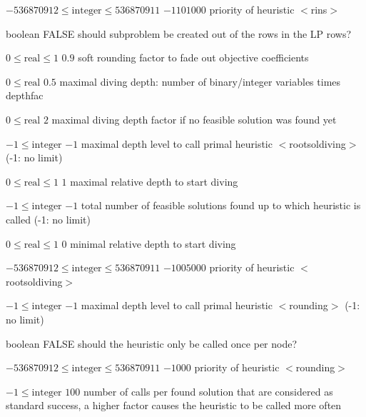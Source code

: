 %
{$-536870912\leq\textrm{integer}\leq536870911$}%
{$-1101000$}%
{priority of heuristic $<$rins$>$}%
{}

%
{boolean}%
{FALSE}%
{should subproblem be created out of the rows in the LP rows?}%
{}

%
{$0\leq\textrm{real}\leq1$}%
{$0.9$}%
{soft rounding factor to fade out objective coefficients}%
{}

%
{$0\leq\textrm{real}$}%
{$0.5$}%
{maximal diving depth: number of binary/integer variables times depthfac}%
{}

%
{$0\leq\textrm{real}$}%
{$2$}%
{maximal diving depth factor if no feasible solution was found yet}%
{}

%
{$-1\leq\textrm{integer}$}%
{$-1$}%
{maximal depth level to call primal heuristic $<$rootsoldiving$>$ (-1: no limit)}%
{}

%
{$0\leq\textrm{real}\leq1$}%
{$1$}%
{maximal relative depth to start diving}%
{}

%
{$-1\leq\textrm{integer}$}%
{$-1$}%
{total number of feasible solutions found up to which heuristic is called (-1: no limit)}%
{}

%
{$0\leq\textrm{real}\leq1$}%
{$0$}%
{minimal relative depth to start diving}%
{}

%
{$-536870912\leq\textrm{integer}\leq536870911$}%
{$-1005000$}%
{priority of heuristic $<$rootsoldiving$>$}%
{}

%
{$-1\leq\textrm{integer}$}%
{$-1$}%
{maximal depth level to call primal heuristic $<$rounding$>$ (-1: no limit)}%
{}

%
{boolean}%
{FALSE}%
{should the heuristic only be called once per node?}%
{}

%
{$-536870912\leq\textrm{integer}\leq536870911$}%
{$-1000$}%
{priority of heuristic $<$rounding$>$}%
{}

%
{$-1\leq\textrm{integer}$}%
{$100$}%
{number of calls per found solution that are considered as standard success, a higher factor causes the heuristic to be called more often}%
{}

